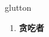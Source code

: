 
\begin{frame}
{\huge glutton}
\begin{center}
\begin{enumerate}\Large
  \item \textbf{贪吃者}
\end{enumerate}
\end{center}
\end{frame}
